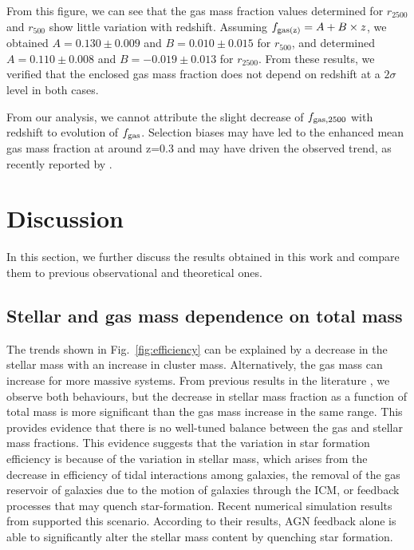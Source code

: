 \documentclass{aa}
\begin{document}
From this figure, we can see that the gas mass fraction values
  determined for $r_{2500}$ and $r_{500}$ show little variation with
  redshift. Assuming $f_{\rm gas(z)} = A + B \times z$, we obtained
  $A=0.130 \pm 0.009$ and $B=0.010 \pm 0.015$ for $r_{500}$, and
  determined $A=0.110 \pm 0.008$ and $B=-0.019 \pm 0.013$ for $r_{2500}$.  From
  these results, we verified that the enclosed gas mass fraction does
  not depend on redshift at a $2\sigma$ level in both cases. 

From our analysis, we cannot attribute the slight decrease of $f_{\rm
    gas,2500}$ with redshift to evolution of $f_{\rm gas}$.  Selection
  biases may have led to the enhanced mean gas mass fraction at
  around z=0.3 and may have driven the observed trend, as
  recently reported by \citet{Landry12}.

\section{Discussion}
\label{disc}

In this section, we further discuss the results obtained in this work
and compare them to previous observational and theoretical ones.  

\subsection{Stellar and gas mass dependence on total mass}

 The trends shown in Fig.~\ref{fig:efficiency} can be
  explained by a decrease in the stellar mass with an increase in cluster
  mass. Alternatively, the gas mass can increase for more massive
  systems.  From previous results in the literature
  \citep{david90,lms03,lagana08,giodini09,lagana11,zlp11}, we observe
  both behaviours, but the decrease in stellar mass fraction as a
  function of total mass is more significant than the gas mass
  increase in the same range. This provides evidence that there is no
  well-tuned balance between the gas and stellar mass fractions.  This
  evidence suggests that the variation in star
  formation efficiency is because of the variation in stellar mass, which arises from
  the decrease in efficiency of tidal interactions among galaxies, the
  removal of the gas reservoir of galaxies due to the motion of galaxies through the ICM, 
  or feedback processes that may quench star-formation.
Recent numerical simulation results from \citet{Dubois13} supported this scenario.
According to their results, AGN feedback alone is able to significantly alter the stellar mass content
by quenching star formation. 
\end{document}
